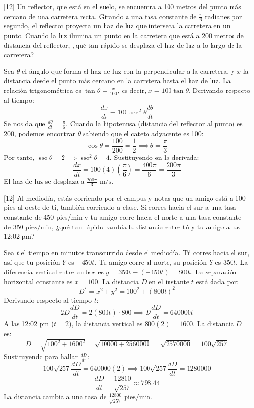 \documentclass[11pt,paper=a4,answers, addpoints]{exam}
\begin{document}
\begin{questions}
[12\half]
Un reflector, que está en el suelo, se encuentra a 100 metros del punto más cercano de una carretera recta. Girando a una tasa constante de $\frac{\pi}{6}$ radianes por segundo, el reflector proyecta un haz de luz que interseca la carretera en un punto. Cuando la luz ilumina un punto en la carretera que está a 200 metros de distancia del reflector, ¿qué tan rápido se desplaza el haz de luz a lo largo de la carretera?
\begin{solution}
Sea $\theta$ el ángulo que forma el haz de luz con la perpendicular a la carretera, y $x$ la distancia desde el punto más cercano en la carretera hasta el haz de luz.
La relación trigonométrica es $\tan\theta = \frac{x}{100}$, es decir, $x = 100 \tan\theta$.
Derivando respecto al tiempo:
\[ \frac{dx}{dt} = 100 \sec^2\theta \frac{d\theta}{dt} \]
Se nos da que $\frac{d\theta}{dt} = \frac{\pi}{6}$.
Cuando la hipotenusa (distancia del reflector al punto) es 200, podemos encontrar $\theta$ sabiendo que el cateto adyacente es 100:
\[ \cos\theta = \frac{100}{200} = \frac{1}{2} \implies \theta = \frac{\pi}{3} \]
Por tanto, $\sec\theta = 2 \implies \sec^2\theta = 4$. Sustituyendo en la derivada:
\[ \frac{dx}{dt} = 100(4)\left(\frac{\pi}{6}\right) = \frac{400\pi}{6} = \frac{200\pi}{3} \]
El haz de luz se desplaza a $\frac{200\pi}{3} \text{ m/s}$.
\end{solution}

[12\half]
Al mediodía, estás corriendo por el campus y notas que un amigo está a 100 pies al oeste de ti, también corriendo a clase. Si corres hacia el sur a una tasa constante de 450 pies/min y tu amigo corre hacia el norte a una tasa constante de 350 pies/min, ¿qué tan rápido cambia la distancia entre tú y tu amigo a las 12:02 pm?
\begin{solution}
Sea $t$ el tiempo en minutos transcurrido desde el mediodía. 
Tú corres hacia el sur, así que tu posición $Y$ es $-450t$. Tu amigo corre al norte, su posición $Y$ es $350t$.
La diferencia vertical entre ambos es $y = 350t - (-450t) = 800t$. La separación horizontal constante es $x = 100$.
La distancia $D$ en el instante $t$ está dada por:
\[ D^2 = x^2 + y^2 = 100^2 + (800t)^2 \]
Derivando respecto al tiempo $t$:
\[ 2D \frac{dD}{dt} = 2(800t) \cdot 800 \implies D \frac{dD}{dt} = 640000t \]
A las 12:02 pm ($t = 2$), la distancia vertical es $800(2) = 1600$. La distancia $D$ es:
\[ D = \sqrt{100^2 + 1600^2} = \sqrt{10000 + 2560000} = \sqrt{2570000} = 100\sqrt{257} \]
Sustituyendo para hallar $\frac{dD}{dt}$:
\[ 100\sqrt{257} \frac{dD}{dt} = 640000(2) \implies 100\sqrt{257} \frac{dD}{dt} = 1280000 \]
\[ \frac{dD}{dt} = \frac{12800}{\sqrt{257}} \approx 798.44 \]
La distancia cambia a una tasa de $\frac{12800}{\sqrt{257}} \text{ pies/min}$.
\end{solution}


\end{questions}
\end{document}
